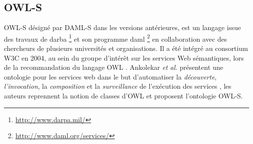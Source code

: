 
    \newpage
    \subsection{OWL-S}
    \label{sec:owl-s}

    \textsc{OWL-S} \cite{martin2004owl} désigné par \textsc{DAML-S}
    \cite{ankolekar2002daml} dans les versions antérieures, est un
    langage issue des travaux de \acrshort{darba}
    \footnote{\url{http://www.darpa.mil/}} et son programme
    \acrshort{daml} \footnote{\url{http://www.daml.org/services/}} en
    collaboration avec des chercheurs de plusieurs universités et
    organisations. Il a été intégré au consortium \textsc{W3C} en
    2004, au sein du groupe d'intérêt sur les services Web
    sémantiques, lors de la recommandation du langage \textsc{OWL}
    \cite{horrocks2002daml+oil} \cite{mcguinness2004owl}.  Ankolekar
    \emph{et al.}  \cite{ankolekar2002daml} présentent une ontologie
    pour les services web dans le but d'automatiser la
    \emph{découverte}, \emph{l'invocation}, la \emph{composition} et
    la \emph{surveillance} de l'exécution des services
    \cite{mcilraith2003bringing}, les auteurs reprennent la notion de
    classes d'\textsc{OWL} et proposent l'ontologie \textsc{OWL-S}.
    

